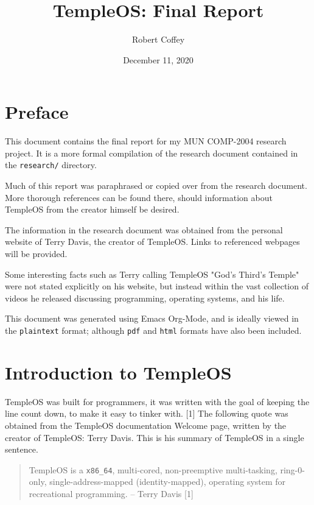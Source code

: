 \documentclass[11pt]{article}
\author{Robert Coffey}
\date{December 11, 2020}
\title{TempleOS: Final Report}
\begin{document}
\maketitle
\tableofcontents

 \newpage
{}

\section{Preface}
\label{sec:orgde729d9}

This document contains the final report for my MUN COMP-2004 research
project. It is a more formal compilation of the research document contained in
the \texttt{research/} directory.

Much of this report was paraphrased or copied over from the research
document. More thorough references can be found there, should information about
TempleOS from the creator himself be desired.

The information in the research document was obtained from the personal website
of Terry Davis, the creator of TempleOS. Links to referenced webpages will be
provided.

Some interesting facts such as Terry calling TempleOS "God's Third's Temple"
were not stated explicitly on his website, but instead within the vast
collection of videos he released discussing programming, operating systems, and
his life.

This document was generated using Emacs Org-Mode, and is ideally viewed in the
\texttt{plaintext} format; although \texttt{pdf} and \texttt{html} formats have also been included.

 \newpage
{}

\section{Introduction to TempleOS}
\label{sec:org0fa85af}

TempleOS was built for programmers, it was written with the goal of keeping the
line count down, to make it easy to tinker with. [1] The following quote was
obtained from the TempleOS documentation Welcome page, written by the creator of
TempleOS: Terry Davis. This is his summary of TempleOS in a single sentence.

\begin{quote}
TempleOS is a \texttt{x86\_64}, multi-cored, non-preemptive multi-tasking, ring-0-only,
single-address-mapped (identity-mapped), operating system for recreational
programming. -- Terry Davis [1]
\end{quote}
\end{document}
